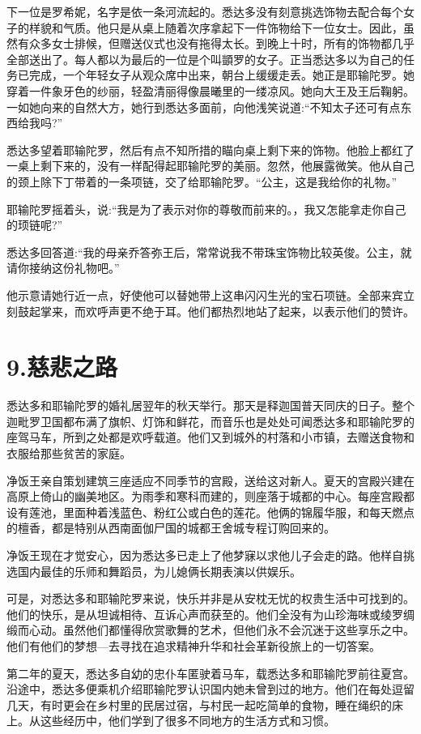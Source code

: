 \documentclass[12pt,twoside,openany]{book}
\begin{document}
下一位是罗希妮，名字是依一条河流起的。悉达多没有刻意挑选饰物去配合每个女子的样貌和气质。他只是从桌上随着次序拿起下一件饰物给下一位女士。因此，虽然有众多女士排候，但赠送仪式也没有拖得太长。到晚上十时，所有的饰物都几乎全部送出了。每人都以为最后的一位是个叫顗罗的女子。正当悉达多以为自己的任务已完成，一个年轻女子从观众席中出来，朝台上缓缓走丢。她正是耶输陀罗。她穿着一件象牙色的纱丽，轻盈清丽得像晨曦里的一缕凉风。她向大王及王后鞠躬。一如她向来的自然大方，她行到悉达多面前，向他浅笑说道:“不知太子还可有点东西给我吗?”

悉达多望着耶输陀罗，然后有点不知所措的瞄向桌上剩下来的饰物。他脸上都红了一桌上剩下来的，没有一样配得起耶输陀罗的美丽。忽然，他展露微笑。他从自己的颈上除下丁带着的一条项链，交了给耶输陀罗。“公主，这是我给你的礼物。”

耶输陀罗摇着头，说:“我是为了表示对你的尊敬而前来的。，我又怎能拿走你自己的顼链呢?”

悉达多回答道:“我的母亲乔答弥王后，常常说我不带珠宝饰物比较英俊。公主，就请你接纳这份礼物吧。”

他示意请她行近一点，好使他可以替她带上这串闪闪生光的宝石项链。全部来宾立刻鼓起掌来，而欢呼声更不绝于耳。他们都热烈地站了起来，以表示他们的赞许。

\chapter{9.慈悲之路}\label{ch9}

悉达多和耶输陀罗的婚礼居翌年的秋天举行。那天是释迦国普天同庆的日子。整个迦毗罗卫国都布满了旗帜、灯饰和鲜花，而音乐也是处处可闻悉达多和耶输陀罗的座驾马车，所到之处都是欢呼载道。他们又到城外的村落和小市镇，去赠送食物和衣服给那些贫苦的家庭。

净饭王亲自策划建筑三座适应不同季节的宫殿，送给这对新人。夏天的宫殿兴建在高原上倚山的幽美地区。为雨季和寒科而建的，则座落于城都的中心。每座宫殿都设有莲池，里面种着浅蓝色、粉红公或白色的莲花。他俩的锦履华服，和每天燃点的檀香，都是特别从西南面伽尸国的城都王舍城专程订购回来的。

净饭王现在才觉安心，因为悉达多已走上了他梦寐以求他儿子会走的路。他样自挑选国内最佳的乐师和舞蹈员，为儿媳俩长期表演以供娱乐。

可是，对悉达多和耶输陀罗来说，快乐并非是从安枕无忧的权贵生活中可找到的。他们的快乐，是从坦诚相待、互诉心声而获至的。他们全没有为山珍海味或绫罗绸缎而心动。虽然他们都懂得欣赏歌舞的艺术，但他们永不会沉迷于这些享乐之中。他们有他们的梦想—去寻找在追求精神升华和社会革新役旅上的一切答案。

第二年的夏天，悉达多自幼的忠仆车匿驶着马车，载悉达多和耶输陀罗前往夏宫。沿途中，悉达多便乘机介绍耶输陀罗认识国内她未曾到过的地方。他们在每处逗留几天，有时更会在乡村里的民居过宿，与村民一起吃简单的食物，睡在绳织的床上。从这些经历中，他们学到了很多不同地方的生活方式和习惯。
\end{document}
